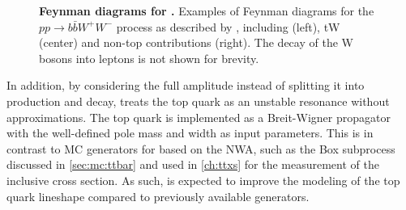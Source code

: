 \begin{figure}[t]
    \caption{\textbf{Feynman diagrams for \bbfourl.} Examples of Feynman diagrams for the $pp \to b \bar{b} W^+ W^-$ process as described by \bbfourl, including \ttbar (left), tW (center) and non-top contributions (right). The decay of the W bosons into leptons is not shown for brevity.}
    \label{fig:bb4l:feynman}
\end{figure}

In addition, by considering the full amplitude instead of splitting it into production and decay, \bbfourl treats the top quark as an unstable resonance without approximations. The top quark is implemented as a Breit-Wigner propagator with the well-defined pole mass and width as input parameters. This is in contrast to MC generators for \ttbar based on the NWA, such as the \powheg Box subprocess \hvq discussed in \cref{sec:mc:ttbar} and used in \cref{ch:ttxs} for the measurement of the inclusive \ttbar cross section. As such, \bbfourl is expected to improve the modeling of the top quark lineshape compared to previously available generators.

